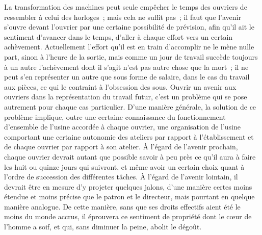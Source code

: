 \documentclass[french,twoside]{book} %
\begin{document}
La transformation des machines peut seule empêcher le temps des ouvriers de ressembler à celui des horloges ; mais cela ne suffit pas ; il faut que l'avenir s'ouvre devant l'ouvrier par une certaine possibilité de prévision, afin qu'il ait le sentiment d'avancer dans le temps, d'aller à chaque effort vers un certain achèvement. Actuellement l'effort qu'il est en train d'accomplir ne le mène nulle part, sinon à l'heure de la sortie, mais comme un jour de travail succède toujours à un autre l'achèvement dont il s'agit n'est pas autre chose que la mort ; il ne peut s'en représenter un autre que sous forme de salaire, dans le cas du travail aux pièces, ce qui le contraint à l'obsession des sous. Ouvrir un avenir aux ouvriers dans la représentation du travail futur, c'est un problème qui se pose autrement pour chaque cas particulier. D'une manière générale, la solution de ce problème implique, outre une certaine connaissance du fonctionnement d'ensemble de l'usine accordée à chaque ouvrier, une organisation de l'usine comportant une certaine autonomie des ateliers par rapport à l'établissement et de chaque ouvrier par rapport à son atelier. À l'égard de l'avenir prochain, chaque ouvrier devrait autant que possible savoir à peu près ce qu'il aura à faire les huit ou quinze jours qui suivront, et même avoir un certain choix quant à l'ordre de succession des différentes tâches. À l'égard de l'avenir lointain, il devrait être en mesure d'y projeter quelques jalons, d'une manière certes moins étendue et moins précise que le patron et le directeur, mais pourtant en quelque manière analogue. De cette manière, sans que ses droits effectifs aient été le moins du monde accrus, il éprouvera ce sentiment de propriété dont le cœur de l'homme a soif, et qui, sans diminuer la peine, abolit le dégoût.\par
\end{document}
